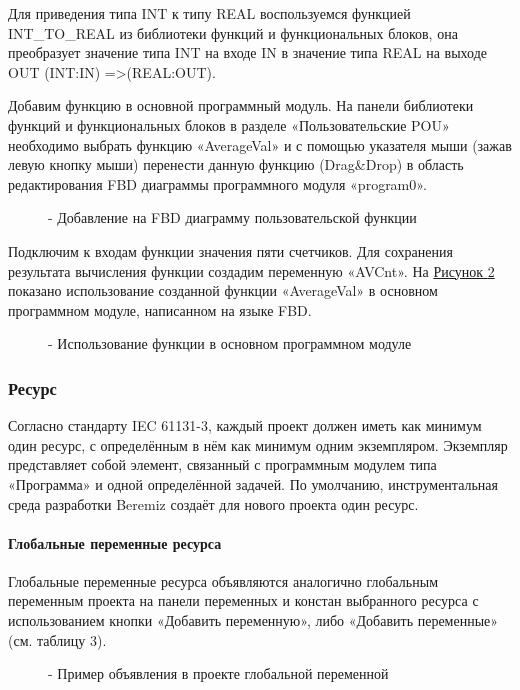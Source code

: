 \documentclass[letterpaper,10pt,russian]{sphinxmanual}
\begin{document}
Для приведения типа INT к типу REAL воспользуемся функцией INT\_TO\_REAL
из библиотеки функций и функциональных блоков, она преобразует значение
типа INT на входе IN в значение типа REAL на выходе OUT (INT:IN)
=\textgreater{}(REAL:OUT).

Добавим функцию в основной программный модуль. На панели библиотеки
функций и функциональных блоков в разделе «Пользовательские POU»
необходимо выбрать функцию «AverageVal» и с помощью указателя мыши
(зажав левую кнопку мыши) перенести данную функцию (Drag\&Drop) в область
редактирования FBD диаграммы программного модуля «program0».
\begin{figure}[htbp]
\centering
\capstart

\noindent{}
\caption{- Добавление на FBD диаграмму пользовательской функции}\label{usage_guide/work_with_project:image193}\end{figure}

Подключим к входам функции значения пяти счетчиков. Для сохранения
результата вычисления функции создадим переменную «AVCnt». На \hyperref[usage_guide/work_with_project:image194]{Рисунок \ref{usage_guide/work_with_project:image194} }
показано использование созданной функции «AverageVal» в основном
программном модуле, написанном на языке FBD.
\begin{figure}[htbp]
\centering
\capstart

\noindent{}
\caption{- Использование функции в основном программном модуле}\label{usage_guide/work_with_project:image194}\end{figure}


\subsubsection{Ресурс}
\label{usage_guide/work_with_project:id10}
Согласно стандарту IEC 61131-3, каждый проект должен иметь как минимум
один ресурс, с определённым в нём как минимум одним экземпляром.
Экземпляр представляет собой элемент, связанный с программным модулем
типа «Программа» и одной определённой задачей. По умолчанию,
инструментальная среда разработки Beremiz создаёт для нового проекта
один ресурс.


\paragraph{Глобальные переменные ресурса}
\label{usage_guide/work_with_project:id11}
Глобальные переменные ресурса объявляются аналогично глобальным
переменным проекта на панели переменных и констан
выбранного ресурса с использованием кнопки «Добавить
переменную», либо «Добавить переменные» (см. таблицу 3).
\begin{figure}[htbp]
\centering
\capstart

\noindent{}
\caption{- Пример объявления в проекте глобальной переменной}\label{usage_guide/work_with_project:image195}\end{figure}
\end{document}
